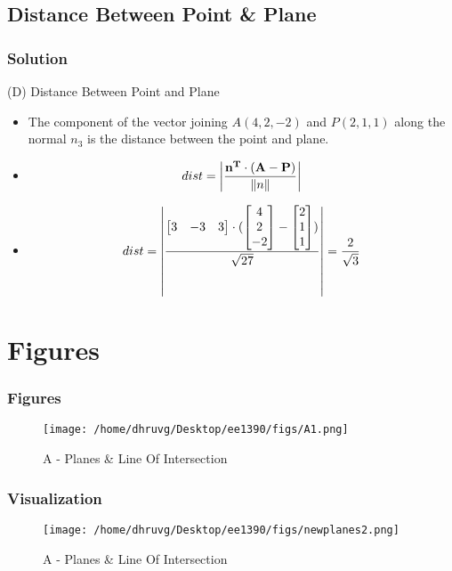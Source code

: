 \documentclass{beamer}
\let\vec\mathbf
\begin{document}
 \subsection{Distance Between Point \& Plane}
 \begin{frame}

\frametitle{Solution}

(D) Distance Between Point and Plane
\begin{itemize}
\item The component of the vector joining $A(4,2,-2)$ and $P(2,1,1)$ along the normal $n_{3}$ is the distance between the point and plane.
\item \[
    dist = \abs{\frac{\vec{n^{T}}\cdot (\vec{A}-\vec{P})}{\norm{n}}}
\]
\item \[
    dist = \abs{\frac{\begin{bmatrix}3 & -3 & 3\end{bmatrix}\cdot(
    \begin{bmatrix}4\\2\\-2\end{bmatrix}-
    \begin{bmatrix}2\\1\\1\end{bmatrix})
    }{\sqrt{27}}} = \frac{2}{\sqrt{3}}
\]
\end{itemize}
\end{frame}
 
\section{Figures}


\begin{frame}
\frametitle{Figures}
\begin{figure}
    \texttt{[image: /home/dhruvg/Desktop/ee1390/figs/A1.png]}
    \caption{A - Planes \& Line Of Intersection}
    \label{A1}
\end{figure}
\end{frame}


 \begin{frame}
\frametitle{Visualization}
\begin{figure}[H]
    \texttt{[image: /home/dhruvg/Desktop/ee1390/figs/newplanes2.png]}
    \caption{A - Planes \& Line Of Intersection}
    \label{A2}
\end{figure}
\end{frame}
 
\end{document}
